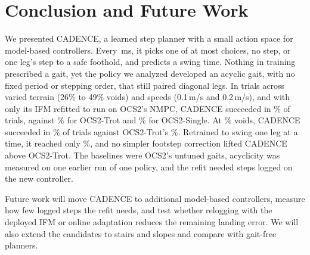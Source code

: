 \section{Conclusion and Future Work}
\label{sec:conclusion}
 We presented CADENCE, a learned step planner with a small
action space for model-based controllers. Every
\corlControlTickMs\,ms, it picks one of at most \corlTotalCandidates{}
choices, no step, or one leg's step to a safe foothold, and
predicts a swing time. Nothing in training prescribed a gait, yet the
policy we analyzed developed an acyclic gait, with no fixed period or
stepping order, that still paired diagonal legs. In trials across varied terrain (26\% to 49\% voids) and speeds (0.1\,m/s and 0.2\,m/s), and with only its IFM
refitted to run on OCS2's NMPC, CADENCE succeeded in
\corlBenchFull\% of trials, against \corlBenchTrot\% for
OCS2-Trot and \corlBenchStaticWalk\% for OCS2-Single. At \corlBenchVoidHigh\% voids,
CADENCE succeeded in \corlBenchFullDense\% of trials against OCS2-Trot's \corlBenchTrotDense\%. Retrained to swing one leg at a time, it
reached only \corlBenchSingle\%, and no simpler footstep correction lifted CADENCE
above OCS2-Trot. The baselines were OCS2's untuned gaits, acyclicity was measured on one earlier run of one policy,
and the refit needed steps logged on the new controller. 

 Future work will move CADENCE to additional
model-based controllers, measure how few logged steps the refit needs,
and test whether relogging with the deployed IFM
\citep{christiano_transfer_2016} or online adaptation
\citep{xie_fada_2026} reduces the remaining landing error. We will also
extend the candidates to stairs and slopes and compare with gait-free planners.
